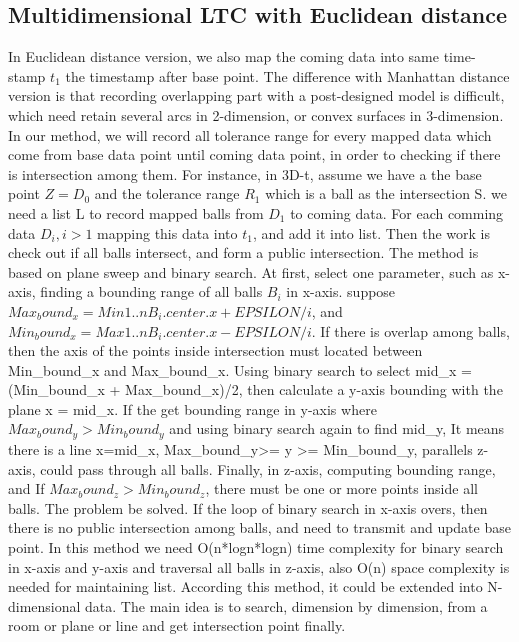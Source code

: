 \documentclass[10pt, conference, compsocconf]{IEEEtran}
\begin{document}
\subsection{Multidimensional LTC with Euclidean distance}
In Euclidean distance version, we also map the coming data into same
time-stamp $t_1$ the timestamp after base point. The difference with
Manhattan distance version is that recording overlapping part with
a post-designed model is difficult, which need retain several arcs in
2-dimension, or convex surfaces in 3-dimension. In our method, we will
record all tolerance range for every mapped data which come from base
data point until coming data point, in order to checking if there is
intersection among them. For instance, in 3D-t, assume we have a the
base point $Z = D_0$ and the tolerance range $R_1$ which is a ball
as the intersection S. we need a list L to record mapped balls
from $D_1$ to coming data. For each comming data $D_i, i>1$ mapping
this data into $t_1$, and add it into list. Then the work is check out
if all balls intersect, and form a public intersection. The method is
based on plane sweep and binary search. At first, select one parameter,
such as x-axis, finding a bounding range of all balls $B_i$ in x-axis.
suppose $Max_bound_x = Min{1..n}{B_i.center.x + EPSILON/i}$, and
$Min_bound_x = Max{1..n}{B_i.center.x - EPSILON/i}$. If there is overlap
among balls, then the axis of the points inside intersection must located
between Min_bound_x and Max_bound_x. Using binary search to select
mid_x = (Min_bound_x + Max_bound_x)/2, then calculate a y-axis bounding
with the plane x = mid_x. If the get bounding range in y-axis where
$Max_bound_y > Min_bound_y$ and using binary search again to find mid_y,
It means there is a line x=mid_x, Max_bound_y>= y >= Min_bound_y,
parallels z-axis, could pass through all balls. Finally, in z-axis,
computing bounding range, and If $Max_bound_z > Min_bound_z$, there
must be one or more points inside all balls. The problem be solved.
If the loop of binary search in x-axis overs, then there is no public
intersection among balls, and need to transmit and update base point.
In this method we need O(n*logn*logn) time complexity for binary search
in x-axis and y-axis and traversal all balls in z-axis, also O(n) space
complexity is needed for maintaining list. According this method,
it could be extended into N-dimensional data. The main idea is to search,
dimension by dimension, from a room or plane or line and get intersection
point finally.
\end{document}
